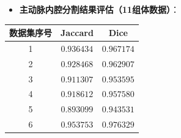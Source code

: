 \begin{frame}
\begin{itemize}
  \item \textbf{主动脉内腔分割结果评估（11组体数据）}：
\end{itemize}
\begin{table}[t]
\renewcommand{\arraystretch}{0.5}
\centering
\begin{tabular*}{75mm}{c c c}
\toprule
\hspace{2mm} \small{数据集序号}  & \hspace{2mm} \small{Jaccard}    & \hspace{2mm} \small{Dice}       \\
\midrule
\hspace{2mm} \small{1}           & \hspace{2mm} \small{$0.936434$} & \hspace{2mm} \small{$0.967174$} \\
\midrule
\hspace{2mm} \small{2}           & \hspace{2mm} \small{$0.928468$} & \hspace{2mm} \small{$0.962907$} \\
\midrule
\hspace{2mm} \small{3}           & \hspace{2mm} \small{$0.911307$} & \hspace{2mm} \small{$0.953595$} \\
\midrule
\hspace{2mm} \small{4}           & \hspace{2mm} \small{$0.918612$} & \hspace{2mm} \small{$0.957580$} \\
\midrule
\hspace{2mm} \small{5}           & \hspace{2mm} \small{$0.893099$} & \hspace{2mm} \small{$0.943531$} \\
\midrule
\hspace{2mm} \small{6}           & \hspace{2mm} \small{$0.953753$} & \hspace{2mm} \small{$0.976329$} \\

\end{tabular*}
\end{table}
\end{frame}
